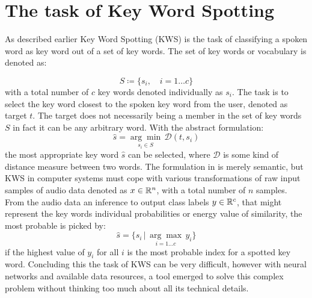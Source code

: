 
\section{The task of Key Word Spotting}\label{sec:intro_kws}
As described earlier Key Word Spotting (KWS) is the task of classifying a spoken word as key word out of a set of key words.
The set of key words or vocabulary is denoted as:

\begin{equation}\label{eq:intro_kws_dict}
	S \coloneqq \{s_i, \quad i=1 \dots c\}
\end{equation}
with a total number of $c$ key words denoted individually as $s_i$.
The task is to select the key word closest to the spoken key word from the user, denoted as target $t$.
The target does not necessarily being a member in the set of key words $S$ in fact it can be any arbitrary word.
With the abstract formulation:
\begin{equation}\label{eq:intro_kws_task}
	\hat{s} = \underset{s_i \in S}{\arg \min} \, \mathcal{D}(t, s_i)
\end{equation}
the most appropriate key word $\hat{s}$ can be selected, where $\mathcal{D}$ is some kind of distance measure between two words.
The formulation in  is merely semantic, but KWS in computer systems must cope with various transformations of raw input samples of audio data denoted as $x \in \mathbb{R}^n$, with a total number of $n$ samples.
From the audio data an inference to output class labels $y \in \mathbb{R}^c$, that might represent the key words individual probabilities or energy value of similarity, the most probable is picked by:
\begin{equation}\label{eq:intro_kws_class}
	\hat{s} = \{s_i \, | \, \underset{i = 1 \dots c}{\arg \max} \, y_i\}
\end{equation}
if the highest value of $y_i$ for all $i$ is the most probable index for a spotted key word.
Concluding this the task of KWS can be very difficult, however with neural networks and available data resources, a tool emerged to solve this complex problem without thinking too much about all its technical details.